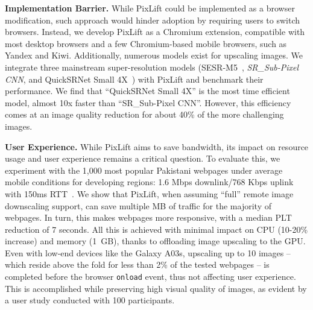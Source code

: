 \documentclass[acmsmall]{acmart}
\newcommand{\tool}{{PixLift}\xspace}
\begin{document}
\vspace{0.05in}
\noindent
\textbf{Implementation Barrier.} While \tool could be implemented as a browser modification, such approach would hinder adoption by requiring users to switch browsers. Instead, we develop \tool as a Chromium extension, compatible with most desktop browsers and a few Chromium-based mobile browsers, such as Yandex and Kiwi. Additionally, numerous models exist for upscaling images. We integrate three mainstream super-resolution models (SESR-M5~\cite{sesrm5}, \textit{SR\_Sub-Pixel CNN}, and QuickSRNet Small 4X~\cite{quicksrnet}) with \tool and benchmark their performance. We find that ``QuickSRNet Small 4X'' is the most time efficient model, almost 10x faster than ``SR\_Sub-Pixel CNN''. However, this efficiency comes at an image quality reduction for about 40\% of the more challenging images. 

\vspace{0.05in}
\noindent
\textbf{User Experience.} While \tool aims to save bandwidth, its impact on resource usage and user experience remains a critical question. To evaluate this, we experiment with the 1,000 most popular Pakistani webpages under average mobile conditions for developing regions: 1.6 Mbps downlink/768 Kbps uplink with 150ms RTT~\cite{digital_divide}. We show that \tool, when assuming ``full'' remote image downscaling support, can save multiple MB of traffic for the majority of webpages. In turn, this makes webpages more responsive, with a median PLT reduction of 7 seconds. All this is achieved with minimal impact on CPU (10-20\% increase) and memory (1~GB), thanks to offloading image upscaling to the GPU. Even with low-end devices like the Galaxy A03s, upscaling up to 10 images -- which reside above the fold for less than 2\% of the tested webpages -- is completed before the browser \texttt{onload} event, thus not affecting user experience. This is accomplished while preserving high visual quality of images, as evident by a user study conducted with 100 participants.
\end{document}
